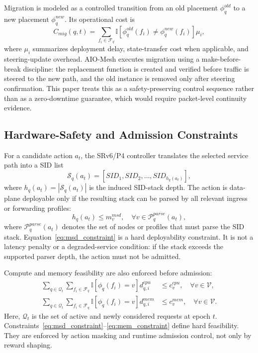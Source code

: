 \documentclass[final,5p]{elsarticle}
\begin{document}
Migration is modeled as a controlled transition from an old placement \(\phi_q^{old}\) to a new placement \(\phi_q^{new}\). Its operational cost is
\begin{equation}
    C_{mig}(q,t)=
    \sum_{f_i\in\mathcal{F}_q}
    \mathbb{I}\!\left[\phi_q^{old}(f_i)\neq \phi_q^{new}(f_i)\right]\mu_i,
\end{equation}
where \(\mu_i\) summarizes deployment delay, state-transfer cost when applicable, and steering-update overhead. AIO-Mesh executes migration using a make-before-break discipline: the replacement function is created and verified before traffic is steered to the new path, and the old instance is removed only after steering confirmation. This paper treats this as a safety-preserving control sequence rather than as a zero-downtime guarantee, which would require packet-level continuity evidence.

\subsection{Hardware-Safety and Admission Constraints}
\label{subsec:hardware_constraint_model}

For a candidate action \(a_t\), the SRv6/P4 controller translates the selected service path into a SID list
\begin{equation}
    \mathcal{S}_q(a_t)=
    \left[SID_1,SID_2,\ldots,SID_{h_q(a_t)}\right],
\end{equation}
where \(h_q(a_t)=|\mathcal{S}_q(a_t)|\) is the induced SID-stack depth. The action is data-plane deployable only if the resulting stack can be parsed by all relevant ingress or forwarding profiles:
\begin{equation}
    h_q(a_t) \leq m_v^{msd},
    \quad
    \forall v\in\mathcal{P}^{parse}_q(a_t),
    \label{eq:msd_constraint}
\end{equation}
where \(\mathcal{P}^{parse}_q(a_t)\) denotes the set of nodes or profiles that must parse the SID stack. Equation~\eqref{eq:msd_constraint} is a hard deployability constraint. It is not a latency penalty or a degraded-service condition: if the stack exceeds the supported parser depth, the action must not be admitted.

Compute and memory feasibility are also enforced before admission:
\begin{align}
    \sum_{q\in\mathcal{Q}_t}
    \sum_{f_i\in\mathcal{F}_q}
    \mathbb{I}\!\left[\phi_q(f_i)=v\right] d_{q,i}^{cpu}
    &\leq c_v^{cpu},
    \quad \forall v\in\mathcal{V}, \label{eq:cpu_constraint}\\
    \sum_{q\in\mathcal{Q}_t}
    \sum_{f_i\in\mathcal{F}_q}
    \mathbb{I}\!\left[\phi_q(f_i)=v\right] d_{q,i}^{mem}
    &\leq c_v^{mem},
    \quad \forall v\in\mathcal{V}. \label{eq:mem_constraint}
\end{align}
Here, \(\mathcal{Q}_t\) is the set of active and newly considered requests at epoch \(t\). Constraints~\eqref{eq:msd_constraint}--\eqref{eq:mem_constraint} define hard feasibility. They are enforced by action masking and runtime admission control, not only by reward shaping.
\end{document}
